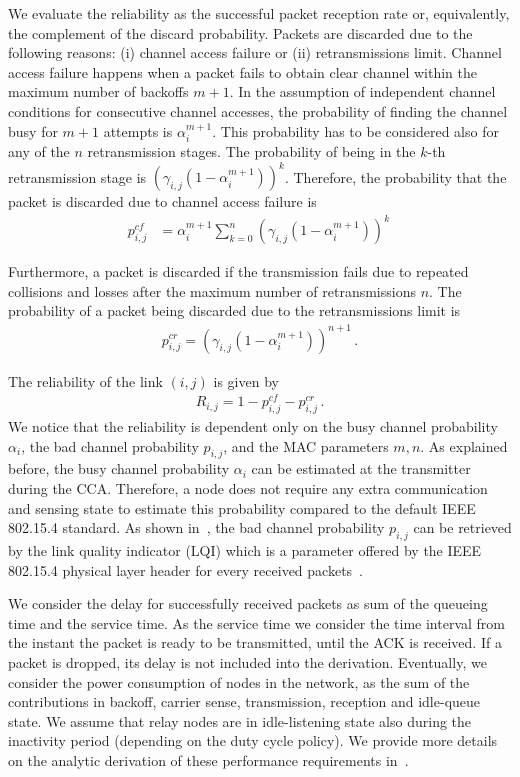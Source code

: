 \documentclass[review, 1p, 11pt]{elsarticle}
\numberwithin{equation}{section}
\begin{document}
We evaluate the reliability as
the successful packet reception rate or, equivalently, the
complement of the discard probability.
Packets are
discarded due to the following reasons: (i) channel access failure or (ii) retransmissions limit. Channel access failure
happens when a packet fails to obtain clear channel within the maximum number of backoffs $m+1$.
In the assumption of independent channel conditions for consecutive channel accesses, the probability
of finding the channel busy for $m+1$ attempts is $\alpha_i^{m+1}$. This probability has to be considered also for any of the  $n$
retransmission stages. The probability of being in the $k$-th retransmission stage is $ (\gamma_{i,j}(1-\alpha_i^{m+1}))^k$.
Therefore, the probability that the packet is discarded due to channel access failure is
\begin{align} \label{eq:channel_fail}
p^{cf}_{i,j} & = \alpha_i^{m+1} \sum_{k=0}^{n} (\gamma_{i,j}(1-\alpha_i^{m+1}))^k \,
\end{align}

Furthermore, a packet is discarded if the transmission
fails due to repeated collisions and losses after the maximum number of retransmissions $n$.
The probability of a packet being discarded due to the retransmissions limit is
\begin{align} \label{eq:collision_repeat}
p^{cr}_{i,j}  =(\gamma_{i,j}(1-\alpha_i^{m+1}))^{n+1}\,.
\end{align}

The reliability of the link $(i,j)$ is given by
\begin{align} \label{eq:reliability4}
R_{i,j} = 1 - p^{cf}_{i,j} - p^{cr}_{i,j}\,.
\end{align}
We notice that the reliability is dependent only on the busy channel probability $\alpha_i$, the bad channel probability $p_{i,j}$, and the MAC parameters $m,n$.
As explained before, the busy channel probability $\alpha_i$ can be estimated at the transmitter during the CCA.
Therefore, a node does not require any extra communication and sensing state to estimate this probability compared to the default IEEE 802.15.4 standard.
As shown in~\cite{gomez}, the bad channel probability $p_{i,j}$ can be retrieved by the link quality indicator (LQI) which is a parameter offered by the IEEE 802.15.4 physical layer header for every received packets~\cite{ieee802154}.

We consider the delay for
successfully received packets as sum of the queueing time and
the service time. As the service time we consider the time interval from the
instant the packet is ready to be transmitted, until the ACK is received. If a packet is dropped,
its delay is not included into the derivation.
Eventually, we consider the power
consumption of nodes in the network, as the sum of the contributions in backoff, carrier sense,
transmission, reception and idle-queue state. We assume that relay
nodes are in idle-listening state also during the inactivity
period (depending on the duty cycle policy).
We provide more details on the analytic derivation of these performance requirements in~\cite{PG_TVT}.
\end{document}
